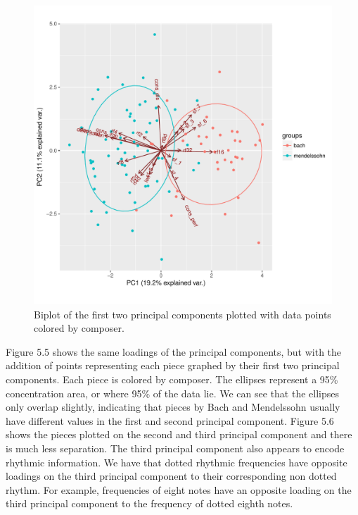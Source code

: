 \documentclass[12pt,twoside]{reedthesis}
\theoremstyle{definition}
\theoremstyle{definition}
\theoremstyle{definition}
\theoremstyle{remark}
\begin{document}
\begin{figure}[H]
\centering
\includegraphics[scale = .7]{images/bi_elipse12.pdf}
\caption{Biplot of the first two principal components plotted with data points colored by composer. }
\label{subd}
\end{figure}
Figure 5.5 shows the same loadings of the principal components, but with
the addition of points representing each piece graphed by their first
two principal components. Each piece is colored by composer. The
ellipses represent a 95\% concentration area, or where 95\% of the data
lie. We can see that the ellipses only overlap slightly, indicating that
pieces by Bach and Mendelssohn usually have different values in the
first and second principal component. Figure 5.6 shows the pieces
plotted on the second and third principal component and there is much
less separation. The third principal component also appears to encode
rhythmic information. We have that dotted rhythmic frequencies have
opposite loadings on the third principal component to their
corresponding non dotted rhythm. For example, frequencies of eight notes
have an opposite loading on the third principal component to the
frequency of dotted eighth notes.
\end{document}
